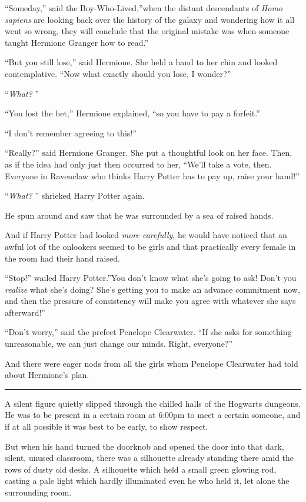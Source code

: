 ``Someday,'' said the Boy-Who-Lived,''when the distant descendants of
\emph{Homo sapiens} are looking back over the history of the galaxy and
wondering how it all went so wrong, they will conclude that the original
mistake was when someone taught Hermione Granger how to read.''

``But you still lose,'' said Hermione. She held a hand to her chin and
looked contemplative. ``Now what exactly should you lose, I wonder?''

``\emph{What?} ''

``You lost the bet,'' Hermione explained, ``so you have to pay a
forfeit.''

``I don't remember agreeing to this!''

``Really?'' said Hermione Granger. She put a thoughtful look on her
face. Then, as if the idea had only just then occurred to her, ``We'll
take a vote, then. Everyone in Ravenclaw who thinks Harry Potter has to
pay up, raise your hand!''

``\emph{What?} '' shrieked Harry Potter again.

He spun around and saw that he was surrounded by a sea of raised hands.

And if Harry Potter had looked \emph{more carefully}, he would have
noticed that an awful lot of the onlookers seemed to be girls and that
practically every female in the room had their hand raised.

``Stop!'' wailed Harry Potter.''You don't know what she's going to ask!
Don't you \emph{realize} what she's doing? She's getting you to make an
advance commitment now, and then the pressure of consistency will make
you agree with whatever she says afterward!''

``Don't worry,'' said the prefect Penelope Clearwater. ``If she asks for
something unreasonable, we can just change our minds. Right, everyone?''

And there were eager nods from all the girls whom Penelope Clearwater
had told about Hermione's plan.

\begin{center}\rule{3in}{0.4pt}\end{center}

A silent figure quietly slipped through the chilled halls of the
Hogwarts dungeons. He was to be present in a certain room at 6:00pm to
meet a certain someone, and if at all possible it was best to be early,
to show respect.

But when his hand turned the doorknob and opened the door into that
dark, silent, unused classroom, there was a silhouette already standing
there amid the rows of dusty old desks. A silhouette which held a small
green glowing rod, casting a pale light which hardly illuminated even he
who held it, let alone the surrounding room.

